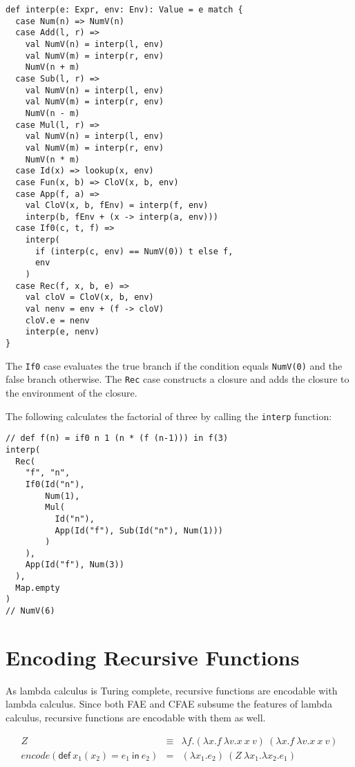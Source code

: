 \begin{verbatim}
def interp(e: Expr, env: Env): Value = e match {
  case Num(n) => NumV(n)
  case Add(l, r) =>
    val NumV(n) = interp(l, env)
    val NumV(m) = interp(r, env)
    NumV(n + m)
  case Sub(l, r) =>
    val NumV(n) = interp(l, env)
    val NumV(m) = interp(r, env)
    NumV(n - m)
  case Mul(l, r) =>
    val NumV(n) = interp(l, env)
    val NumV(m) = interp(r, env)
    NumV(n * m)
  case Id(x) => lookup(x, env)
  case Fun(x, b) => CloV(x, b, env)
  case App(f, a) =>
    val CloV(x, b, fEnv) = interp(f, env)
    interp(b, fEnv + (x -> interp(a, env)))
  case If0(c, t, f) =>
    interp(
      if (interp(c, env) == NumV(0)) t else f,
      env
    )
  case Rec(f, x, b, e) =>
    val cloV = CloV(x, b, env)
    val nenv = env + (f -> cloV)
    cloV.e = nenv
    interp(e, nenv)
}
\end{verbatim}

The \verb!If0! case evaluates the true branch if the condition equals
\verb!NumV(0)! and the false branch otherwise. The \verb!Rec! case constructs a
closure and adds the closure to the environment of the closure.

The following calculates the factorial of three by calling the \verb!interp!
function:

\begin{verbatim}
// def f(n) = if0 n 1 (n * (f (n-1))) in f(3)
interp(
  Rec(
    "f", "n",
    If0(Id("n"),
        Num(1),
        Mul(
          Id("n"),
          App(Id("f"), Sub(Id("n"), Num(1)))
        )
    ),
    App(Id("f"), Num(3))
  ),
  Map.empty
)
// NumV(6)
\end{verbatim}

\section{Encoding Recursive Functions
}

As lambda calculus is Turing complete, recursive functions are encodable with
lambda calculus. Since both FAE and CFAE subsume the features of lambda calculus,
recursive functions are encodable with them as well.

\[
\begin{array}{rcl}
Z&\equiv&\lambda f.(\lambda x.f\ \lambda v.x\ x\ v)\ (\lambda x.f\ \lambda v.x\
x\ v)\\
\mathit{encode}(\textsf{def}\ x_1(x_2)=e_1\ \textsf{in}\ e_2)&=&
(\lambda x_1.e_2)\ (Z\ \lambda x_1.\lambda x_2.e_1)
\end{array}
\]

